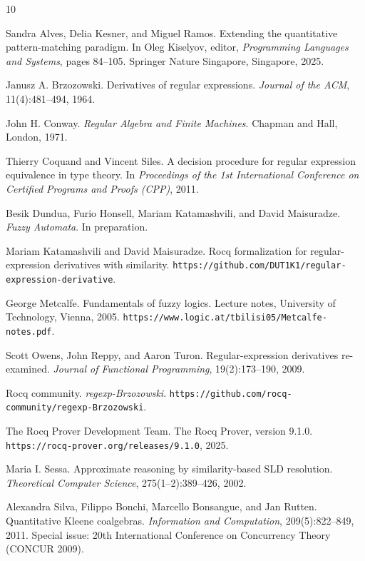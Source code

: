 \documentclass{easychair}
\begin{document}
\begin{thebibliography}{10}

Sandra Alves, Delia Kesner, and Miguel Ramos.
\newblock Extending the quantitative pattern-matching paradigm.
\newblock In Oleg Kiselyov, editor, \emph{Programming Languages and Systems},
pages 84--105.
\newblock Springer Nature Singapore, Singapore, 2025.

Janusz A. Brzozowski.
\newblock Derivatives of regular expressions.
\newblock \emph{Journal of the ACM}, 11(4):481--494, 1964.

John H. Conway.
\newblock \emph{Regular Algebra and Finite Machines}.
\newblock Chapman and Hall, London, 1971.

Thierry Coquand and Vincent Siles.
\newblock A decision procedure for regular expression equivalence in type theory.
\newblock In \emph{Proceedings of the 1st International Conference on Certified Programs and Proofs (CPP)}, 2011.

Besik Dundua, Furio Honsell, Mariam Katamashvili, and David Maisuradze.
\newblock \emph{Fuzzy Automata}.
\newblock In preparation.

Mariam Katamashvili and David Maisuradze.
\newblock Rocq formalization for regular-expression derivatives with similarity.
\newblock \texttt{https://github.com/DUT1K1/regular-expression-derivative}.

George Metcalfe.
\newblock Fundamentals of fuzzy logics.
\newblock Lecture notes, University of Technology, Vienna, 2005.
\newblock \texttt{https://www.logic.at/tbilisi05/Metcalfe-notes.pdf}.

Scott Owens, John Reppy, and Aaron Turon.
\newblock Regular-expression derivatives re-examined.
\newblock \emph{Journal of Functional Programming}, 19(2):173--190, 2009.

Rocq community.
\newblock \emph{regexp-Brzozowski}.
\newblock \texttt{https://github.com/rocq-community/regexp-Brzozowski}.

The Rocq Prover Development Team.
\newblock The Rocq Prover, version 9.1.0.
\newblock \texttt{https://rocq-prover.org/releases/9.1.0}, 2025.

Maria I. Sessa.
\newblock Approximate reasoning by similarity-based SLD resolution.
\newblock \emph{Theoretical Computer Science}, 275(1--2):389--426, 2002.

Alexandra Silva, Filippo Bonchi, Marcello Bonsangue, and Jan Rutten.
\newblock Quantitative Kleene coalgebras.
\newblock \emph{Information and Computation}, 209(5):822--849, 2011.
\newblock Special issue: 20th International Conference on Concurrency Theory
(CONCUR 2009).

\end{thebibliography}
\end{document}
